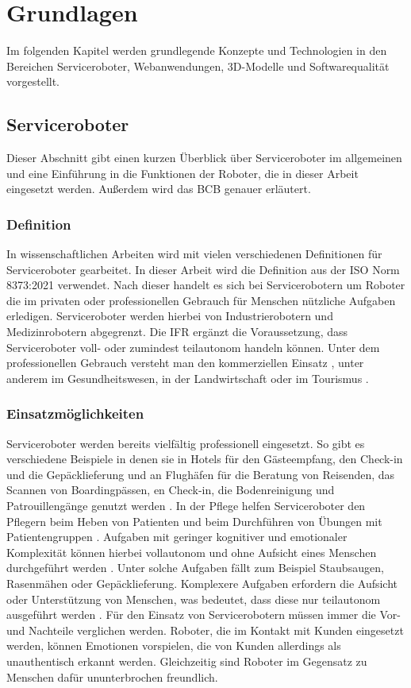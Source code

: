 \newpage
\section{Grundlagen}\label{Grundlagen}
Im folgenden Kapitel werden grundlegende Konzepte und Technologien in den Bereichen Serviceroboter, Webanwendungen, 3D-Modelle und Softwarequalität vorgestellt.

\subsection{Serviceroboter}
Dieser Abschnitt gibt einen kurzen Überblick über Serviceroboter im allgemeinen und eine Einführung in die Funktionen der Roboter, die in dieser Arbeit eingesetzt werden. Außerdem wird das \ac{BCB} genauer erläutert.

\subsubsection{Definition}
In wissenschaftlichen Arbeiten wird mit vielen verschiedenen Definitionen für Serviceroboter gearbeitet. In dieser Arbeit wird die Definition aus der ISO Norm 8373:2021 \cite[Kap.~3]{ISO2021} verwendet. Nach dieser handelt es sich bei Servicerobotern um Roboter die im privaten oder professionellen Gebrauch für Menschen nützliche Aufgaben erledigen. Serviceroboter werden hierbei von Industrierobotern und Medizinrobotern abgegrenzt. Die \ac{IFR} \cite{IFR2024} ergänzt die Voraussetzung, dass Serviceroboter voll- oder zumindest teilautonom handeln können. Unter dem professionellen Gebrauch versteht man den kommerziellen Einsatz \cite[S.~4]{GonzalezAguirre2021}, unter anderem im Gesundheitswesen, in der Landwirtschaft oder im Tourismus \cite[S.~9]{GonzalezAguirre2021}.

\subsubsection{Einsatzmöglichkeiten}
Serviceroboter werden bereits vielfältig professionell eingesetzt. So gibt es verschiedene Beispiele in denen sie in Hotels für den Gästeempfang, den Check-in und die Gepäcklieferung und an Flughäfen für die Beratung von Reisenden, das Scannen von Boardingpässen, en Check-in, die Bodenreinigung und Patrouillengänge genutzt werden \cite[S.~425]{Paluch2020}. In der Pflege helfen Serviceroboter den Pflegern beim Heben von Patienten und beim Durchführen von Übungen mit Patientengruppen \cite[S.~427]{Paluch2020}. Aufgaben mit geringer kognitiver und emotionaler Komplexität können hierbei vollautonom und ohne Aufsicht eines Menschen durchgeführt werden \cite[S.~429]{Paluch2020}. Unter solche Aufgaben fällt zum Beispiel Staubsaugen, Rasenmähen oder Gepäcklieferung. Komplexere Aufgaben erfordern die Aufsicht oder Unterstützung von Menschen, was bedeutet, dass diese nur teilautonom ausgeführt werden \cite[S.~430-431]{Paluch2020}. Für den Einsatz von Servicerobotern müssen immer die Vor- und Nachteile verglichen werden. Roboter, die im Kontakt mit Kunden eingesetzt werden, können Emotionen vorspielen, die von Kunden allerdings als unauthentisch erkannt werden. Gleichzeitig sind Roboter im Gegensatz zu Menschen dafür ununterbrochen freundlich.\cite[S.~427]{Paluch2020}


